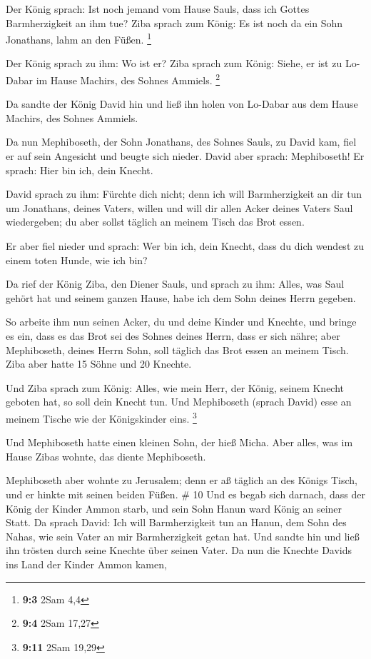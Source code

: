  Der König sprach: Ist noch jemand vom Hause Sauls, dass
ich Gottes Barmherzigkeit an ihm tue? Ziba sprach zum König: Es ist noch
da ein Sohn Jonathans, lahm an den Füßen. \footnote{\textbf{9:3} 2Sam
  4,4}

 Der König sprach zu ihm: Wo ist er? Ziba sprach zum
König: Siehe, er ist zu Lo-Dabar im Hause Machirs, des Sohnes Ammiels.
\footnote{\textbf{9:4} 2Sam 17,27}

 Da sandte der König David hin und ließ ihn holen von
Lo-Dabar aus dem Hause Machirs, des Sohnes Ammiels.

 Da nun Mephiboseth, der Sohn Jonathans, des Sohnes Sauls,
zu David kam, fiel er auf sein Angesicht und beugte sich nieder. David
aber sprach: Mephiboseth! Er sprach: Hier bin ich, dein Knecht.

 David sprach zu ihm: Fürchte dich nicht; denn ich will
Barmherzigkeit an dir tun um Jonathans, deines Vaters, willen und will
dir allen Acker deines Vaters Saul wiedergeben; du aber sollst täglich
an meinem Tisch das Brot essen.

 Er aber fiel nieder und sprach: Wer bin ich, dein Knecht,
dass du dich wendest zu einem toten Hunde, wie ich bin?

 Da rief der König Ziba, den Diener Sauls, und sprach zu
ihm: Alles, was Saul gehört hat und seinem ganzen Hause, habe ich dem
Sohn deines Herrn gegeben.

 So arbeite ihm nun seinen Acker, du und deine Kinder und
Knechte, und bringe es ein, dass es das Brot sei des Sohnes deines
Herrn, dass er sich nähre; aber Mephiboseth, deines Herrn Sohn, soll
täglich das Brot essen an meinem Tisch. Ziba aber hatte 15 Söhne und 20
Knechte.

 Und Ziba sprach zum König: Alles, wie mein Herr, der
König, seinem Knecht geboten hat, so soll dein Knecht tun. Und
Mephiboseth (sprach David) esse an meinem Tische wie der Königskinder
eins. \footnote{\textbf{9:11} 2Sam 19,29}

 Und Mephiboseth hatte einen kleinen Sohn, der hieß
Micha. Aber alles, was im Hause Zibas wohnte, das diente Mephiboseth.

 Mephiboseth aber wohnte zu Jerusalem; denn er aß täglich
an des Königs Tisch, und er hinkte mit seinen beiden Füßen. \# 10
 Und es begab sich darnach, dass der König der Kinder
Ammon starb, und sein Sohn Hanun ward König an seiner Statt.
 Da sprach David: Ich will Barmherzigkeit tun an Hanun,
dem Sohn des Nahas, wie sein Vater an mir Barmherzigkeit getan hat. Und
sandte hin und ließ ihn trösten durch seine Knechte über seinen Vater.
Da nun die Knechte Davids ins Land der Kinder Ammon kamen,

